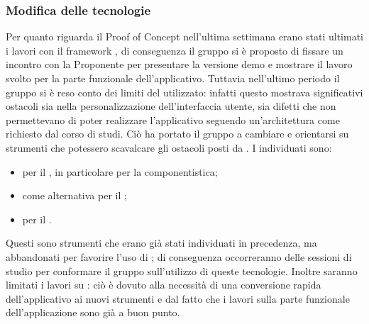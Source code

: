 \subsubsection{Modifica delle tecnologie}
\par Per quanto riguarda il Proof of Concept nell'ultima settimana erano stati ultimati i lavori con il framework , di conseguenza il gruppo si è proposto di fissare un incontro con la Proponente per presentare la versione demo e mostrare il lavoro svolto per la parte funzionale dell'applicativo.
Tuttavia nell'ultimo periodo il gruppo si è reso conto dei limiti del  utilizzato: infatti questo mostrava significativi ostacoli sia nella personalizzazione dell'interfaccia utente, sia difetti che non permettevano di poter realizzare l'applicativo seguendo un'architettura come richiesto dal corso di studi.
Ciò ha portato il gruppo a cambiare  e orientarsi su strumenti che potessero scavalcare gli ostacoli posti da . 
I  individuati sono:
\begin{itemize}
	\item {} per il , in particolare per la componentistica;
	\item {} come alternativa per il ;
	\item {} per il .
\end{itemize}
Questi sono strumenti che erano già stati individuati in precedenza, ma abbandonati per favorire l'uso di ; di conseguenza occorreranno delle sessioni di studio per conformare il gruppo sull'utilizzo di queste tecnologie. 
Inoltre saranno limitati i lavori su : ciò è dovuto alla necessità di una conversione rapida dell'applicativo ai nuovi strumenti e dal fatto che i lavori sulla parte funzionale dell'applicazione sono già a buon punto.

